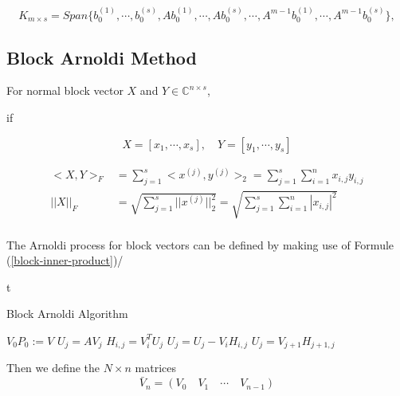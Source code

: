 \begin{equation}
	K_{m\times s}=Span\{b_0^{(1)},\cdots,b_0^{(s)}, Ab_0^{(1)},\cdots,Ab_0^{(s)},\cdots,A^{m-1}b_0^{(1)},\cdots,A^{m-1}b_0^{(s)} \},
\end{equation}

\subsection{Block Arnoldi Method}

For normal block vector $X$ and $Y \in \mathbb{C}^{n \times s}$, 

if

\begin{equation}
	X=[x_1,\cdots,x_s],\quad Y=[y_1,\cdots,y_s]
\end{equation}

\begin{equation}
\label{block-inner-product}
	\begin{aligned}
	<X,Y>_F&=\sum_{j=1}^{s}<x^{(j)},y^{(j)}>_2=\sum_{j=1}^{s}\sum_{i=1}^{n}x_{i,j}y_{i,j} \\
	||X||_F&=\sqrt{\sum_{j=1}^{s}||x^{(j)}||^2_2}=\sqrt{\sum_{j=1}^{s}\sum_{i=1}^{n}|x_{i,j}|^2} \\
	\end{aligned}
\end{equation}

The Arnoldi process for block vectors can be defined by making use of Formule (\ref{block-inner-product})/
\begin{algorithm}[htbp]{t}
	\caption{Block Arnoldi Algorithm}   
	\label{alg:block arnoldi}   
	\begin{algorithmic}[1]
		\State $V_0P_0 := V$ 
		\State $U_j = AV_{j}$  
		\State $H_{i,j} = V_i^T U_j$ 
		\State $U_j = U_j - V_iH_{i,j}$ 
		\EndFor
		\State $U_j = V_{j+1}H_{j+1,j}$  
		\EndFor 
		\EndFunction
	\end{algorithmic}  
\end{algorithm}

Then we define the $N\times n$ matrices
\[\bar{V}_n = (V_0 \quad V_1  \quad \cdots  \quad V_{n-1})\]

